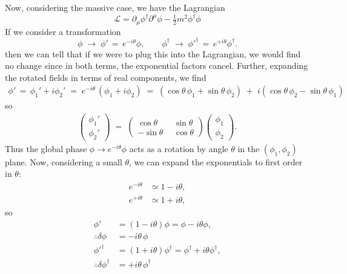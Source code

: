 \documentclass[12pt]{article}
\newcommand{\delmu}{\partial_{\mu}}
\newcommand{\delMu}{\partial^{\mu}}
\begin{document}
Now, considering the massive case, we have the Lagrangian
\begin{equation*}
   \mathcal{L} = \delmu\phi^{\dagger}\delMu\phi - \tfrac12 m^2 \phi^{\dagger}\phi
\end{equation*}
If we consider a transformation 
\begin{equation*}
   \phi \;\to\; \phi' \,=\, e^{-i\theta}\phi, \qquad
   \phi^\dagger \;\to\; \phi'^{\dagger} \,=\, e^{+i\theta}\phi^\dagger .
\end{equation*}
then we can tell that if we were to plug this into the Lagrangian, we would
find no change since in both terms, the exponential factors cancel. Further,
expanding the rotated fields in terms of real components, we find
\begin{align*}
   \phi' \,=\, \phi_1'+i\phi_2'
   \;=\; e^{-i\theta}\,(\phi_1+i\phi_2)
   \;=\; (\cos\theta\,\phi_1+\sin\theta\,\phi_2)
   \;+\; i(\cos\theta\,\phi_2-\sin\theta\,\phi_1)
\end{align*}
so
\begin{align*}
   \begin{pmatrix}\phi_1'\\ \phi_2'\end{pmatrix}
   \;=\;
   \begin{pmatrix}
      \cos\theta & \ \ \sin\theta \\
      -\sin\theta & \ \ \cos\theta
   \end{pmatrix}
   \begin{pmatrix}\phi_1\\ \phi_2\end{pmatrix}.
\end{align*}
Thus the global phase $\phi\to e^{-i\theta}\phi$ acts as a rotation by angle $\theta$ in the $(\phi_1,\phi_2)$ plane.
Now, considering a small $\theta$, we can expand the exponentials to first order in $\theta$:
\begin{align*}
   e^{-i\theta} &\simeq 1 - i\theta, \\
   e^{+i\theta} &\simeq 1 + i\theta,
\end{align*}
so
\begin{align*}
    \phi' &= (1 - i\theta)\phi = \phi - i\theta\phi, \\
   \therefore \delta\phi &= -i\theta\,\phi \\
   \phi'^{\dagger} &= (1 + i\theta)\phi^{\dagger} = \phi^{\dagger} + i\theta\phi^{\dagger}, \\
   \therefore \delta\phi^\dagger &= +i\theta\,\phi^\dagger
\end{align*}
\end{document}
